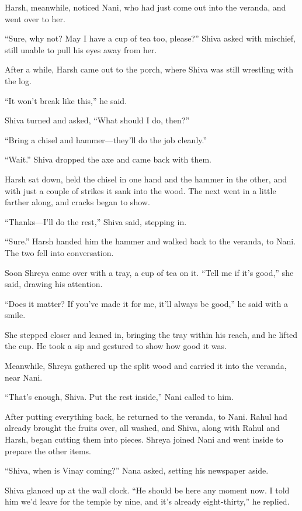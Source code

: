 Harsh, meanwhile, noticed Nani, who had just come out into the veranda, and went over to her.

``Sure, why not? May I have a cup of tea too, please?'' Shiva asked with mischief, still unable to pull his eyes away from her.

After a while, Harsh came out to the porch, where Shiva was still wrestling with the log.

``It won't break like this,'' he said.

Shiva turned and asked, ``What should I do, then?''

``Bring a chisel and hammer—they'll do the job cleanly.''

``Wait.'' Shiva dropped the axe and came back with them.

Harsh sat down, held the chisel in one hand and the hammer in the other, and with just a couple of strikes it sank into the wood. The next went in a little farther along, and cracks began to show.

``Thanks—I'll do the rest,'' Shiva said, stepping in.

``Sure.'' Harsh handed him the hammer and walked back to the veranda, to Nani. The two fell into conversation.

Soon Shreya came over with a tray, a cup of tea on it. ``Tell me if it's good,'' she said, drawing his attention.

``Does it matter? If you've made it for me, it'll always be good,'' he said with a smile.

She stepped closer and leaned in, bringing the tray within his reach, and he lifted the cup. He took a sip and gestured to show how good it was.

Meanwhile, Shreya gathered up the split wood and carried it into the veranda, near Nani.

``That's enough, Shiva. Put the rest inside,'' Nani called to him.

After putting everything back, he returned to the veranda, to Nani. Rahul had already brought the fruits over, all washed, and Shiva, along with Rahul and Harsh, began cutting them into pieces. Shreya joined Nani and went inside to prepare the other items.

``Shiva, when is Vinay coming?'' Nana asked, setting his newspaper aside.

Shiva glanced up at the wall clock. ``He should be here any moment now. I told him we'd leave for the temple by nine, and it's already eight-thirty,'' he replied.

